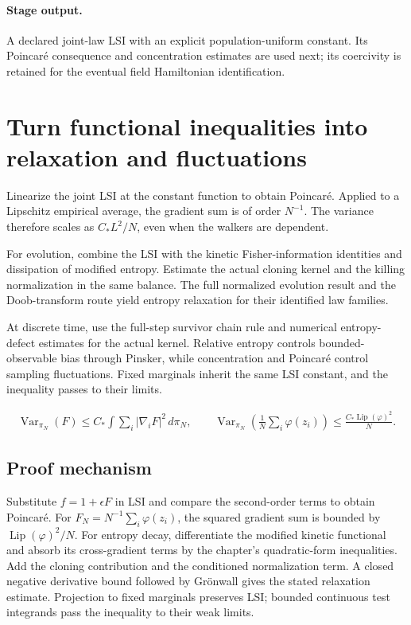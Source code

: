 \documentclass[11pt,a4paper]{article}
\begin{document}
\paragraph{Stage output.} A declared joint-law LSI with an explicit population-uniform constant. Its Poincar\'e consequence and concentration estimates are used next; its coercivity is retained for the eventual field Hamiltonian identification.

\section{Turn functional inequalities into relaxation and fluctuations}
\label{stage:8}
Linearize the joint LSI at the constant function to obtain Poincar\'e. Applied to a Lipschitz empirical average, the gradient sum is of order \(N^{-1}\). The variance therefore scales as \(C_*L^2/N\), even when the walkers are dependent.

For evolution, combine the LSI with the kinetic Fisher-information identities and dissipation of modified entropy. Estimate the actual cloning kernel and the killing normalization in the same balance. The full normalized evolution result and the Doob-transform route yield entropy relaxation for their identified law families.

At discrete time, use the full-step survivor chain rule and numerical entropy-defect estimates for the actual kernel. Relative entropy controls bounded-observable bias through Pinsker, while concentration and Poincar\'e control sampling fluctuations. Fixed marginals inherit the same LSI constant, and the inequality passes to their limits.


\begin{gather*}
\operatorname{Var}_{\pi_N}(F)\le C_*\int\sum_i|\nabla_iF|^2\,d\pi_N,\qquad
\operatorname{Var}_{\pi_N}\!\left(\frac1N\sum_i\varphi(z_i)\right)\le\frac{C_*\operatorname{Lip}(\varphi)^2}{N}.
\end{gather*}
\subsection*{Proof mechanism}
Substitute \(f=1+\epsilon F\) in LSI and compare the second-order terms to obtain Poincar\'e. For \(F_N=N^{-1}\sum_i\varphi(z_i)\), the squared gradient sum is bounded by \(\operatorname{Lip}(\varphi)^2/N\). For entropy decay, differentiate the modified kinetic functional and absorb its cross-gradient terms by the chapter's quadratic-form inequalities. Add the cloning contribution and the conditioned normalization term. A closed negative derivative bound followed by Gr\"onwall gives the stated relaxation estimate. Projection to fixed marginals preserves LSI; bounded continuous test integrands pass the inequality to their weak limits.
\end{document}
